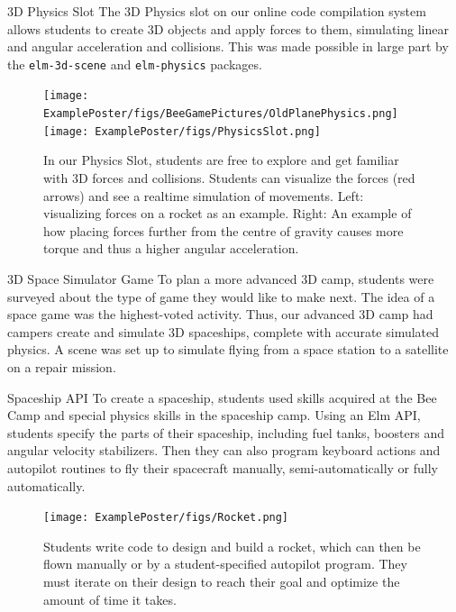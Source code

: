 \documentclass[22pt]{beamer}
\begin{document}
\begin{frame}[fragile]
\begin{textblock}{7.25}
\begin{block}{3D Physics Slot}
The 3D Physics slot on our online code compilation system allows students to create 3D objects
and apply forces to them, simulating linear and angular acceleration and collisions. This was made
possible in large part by the \texttt{elm-3d-scene} and \texttt{elm-physics} packages.
\begin{figure}
\texttt{[image: ExamplePoster/figs/BeeGamePictures/OldPlanePhysics.png]}
\texttt{[image: ExamplePoster/figs/PhysicsSlot.png]}
\caption{In our Physics Slot, students are free to explore and get familiar with 3D forces and collisions. Students can visualize the forces (red arrows) and see a realtime simulation of movements. Left: visualizing forces on a rocket as an example. Right: An example of how placing forces further from the centre of gravity causes more torque and 
thus a higher angular acceleration.}
\end{figure}
\vspace{-5mm}
\end{block}

\begin{block}{3D Space Simulator Game}
To plan a more advanced 3D camp, students were surveyed about the type of game they would like to make
next. The idea of a space game was the highest-voted activity. Thus, our advanced 3D camp had campers
create and simulate 3D spaceships, complete with accurate simulated physics. A scene was set up to 
simulate flying from a space station to a satellite on a repair mission.
\end{block}

\begin{block}{Spaceship API}
To create a spaceship, students used skills acquired at the Bee Camp and special physics skills in the
spaceship camp. Using an Elm API, students specify the parts of their spaceship, including fuel tanks, 
boosters and angular velocity stabilizers. Then they can also program 
keyboard actions and autopilot routines to fly their spacecraft manually, semi-automatically or fully 
automatically.

\begin{figure}
\texttt{[image: ExamplePoster/figs/Rocket.png]}
\caption{Students write code to design and build a rocket, which can then be flown manually or by
a student-specified autopilot program. They must iterate on their design to reach their goal and
optimize the amount of time it takes.}
\end{figure}
\end{block}


\end{textblock}
\end{frame}
\end{document}
